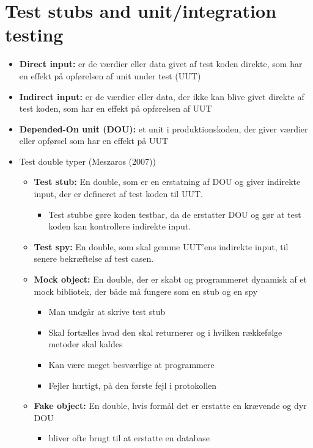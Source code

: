 \documentclass[a4, english]{article}
\begin{document}
\section{Test stubs and unit/integration testing}
\begin{itemize}
	\item \textbf{Direct input:} er de værdier eller data givet af test koden direkte, som har en effekt på opførelsen af unit under test (UUT)
  \item \textbf{Indirect input:} er de værdier eller data, der ikke kan blive givet direkte af test koden, som har en effekt på opførelsen af UUT
  \item \textbf{Depended-On unit (DOU):} et unit i produktionskoden, der giver værdier eller opførsel som har en effekt på UUT
  \item Test double typer (Meszaros (2007))
  \begin{itemize}
    \item \textbf{Test stub:} En double, som er en erstatning af DOU og giver indirekte input, der er defineret af test koden til UUT.
    \begin{itemize}
      \item Test stubbe gøre koden testbar, da de erstatter DOU og gør at test koden kan kontrollere indirekte input. 
    \end{itemize}
    \item \textbf{Test spy:} En double, som skal gemme UUT'ens indirekte input, til senere bekræftelse af test casen.
    \item \textbf{Mock object:} En double, der er skabt og programmeret dynamisk af et mock bibliotek, der både må fungere som en stub og en spy  
    \begin{itemize}
    	\item Man undgår at skrive test stub
      \item Skal fortælles hvad den skal returnerer og i hvilken rækkefølge metoder skal kaldes
      \item Kan være meget besværlige at programmere 
      \item Fejler hurtigt, på den første fejl i protokollen 
    \end{itemize}
    \item \textbf{Fake object:} En double, hvis formål det er erstatte en krævende og dyr DOU 
    \begin{itemize}
    	\item bliver ofte brugt til at erstatte en database 
    \end{itemize}

\end{itemize}
\end{itemize}
\end{document}
